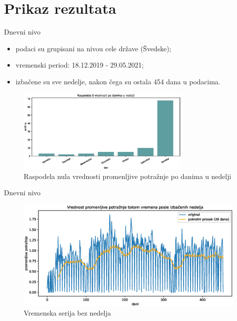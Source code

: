 \documentclass{beamer}
\begin{document}
\section{Prikaz rezultata}
\begin{frame}{Dnevni nivo}
\begin{itemize}
\item podaci su grupisani na nivou cele države (Švedske);
\item vremenski period: 18.12.2019 - 29.05.2021;
\item izbačene su sve nedelje, nakon čega su ostala 454 dana u podacima.
\end{itemize}
\vspace{-10px}

\begin{figure}[!ht]
  \centering
  \includegraphics[width=0.75\textwidth]{./images/grafici/nule_po_danima_nedelje.eps}
  \vspace{-10px}
  \caption{Raspodela nula vrednosti promenljive potražnje po danima u nedelji}
  \label{fig: dani_nedelje}
\end{figure}

\end{frame}

\begin{frame}{Dnevni nivo}
    \begin{figure}[!ht]
      \centering
      \includegraphics[width=1\textwidth]{./images/grafici/vremenska_serija_primer_bez_nedelja.eps}
      \caption{Vremenska serija bez nedelja}
      \label{fig: dnevna_vremenska_serija_bez_nedelja}
    \end{figure}
\end{frame}
\end{document}

